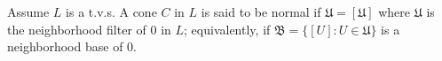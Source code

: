 Assume $L$ is a t.v.s. A cone $C$ in $L$ is said to be normal if $\mathfrak{U} = [\mathfrak{U}]$ where $\mathfrak{U}$ is the neighborhood filter of 0 in $L$; equivalently, if $\mathfrak{B} = \{[U]: U \in \mathfrak{U}\}$ is a neighborhood base of 0.
